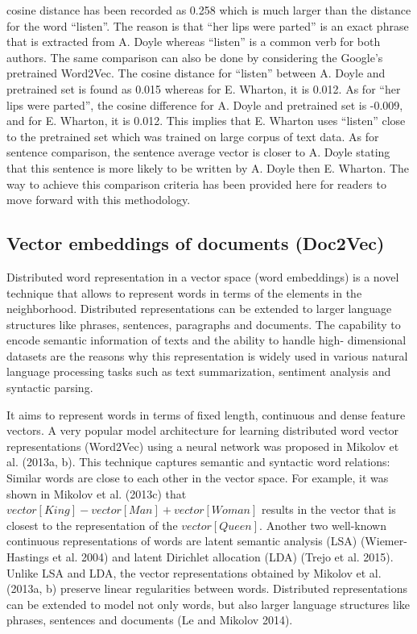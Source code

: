 cosine distance has been recorded as 0.258 which is much larger than the distance for
the word “listen”. The reason is that “her lips were parted” is an exact phrase that
is extracted from A. Doyle whereas “listen” is a common verb for both authors. The
same comparison can also be done by considering the Google’s pretrained Word2Vec.
The cosine distance for “listen” between A. Doyle and pretrained set is found as 0.015
whereas for E. Wharton, it is 0.012. As for “her lips were parted”, the cosine difference
for A. Doyle and pretrained set is -0.009, and for E. Wharton, it is 0.012. This implies
that E. Wharton uses “listen” close to the pretrained set which was trained on large
corpus of text data. As for sentence comparison, the sentence average vector is closer
to A. Doyle stating that this sentence is more likely to be written by A. Doyle then
E. Wharton. The way to achieve this comparison criteria has been provided here for
readers to move forward with this methodology.

\subsection{Vector embeddings of documents (Doc2Vec)}

Distributed word representation in a vector space (word embeddings) is a novel technique that allows to represent words in terms of the elements in the neighborhood.
Distributed representations can be extended to larger language structures like phrases, sentences, paragraphs and documents. The capability to encode semantic information of texts and the ability to handle high- dimensional datasets are the reasons why this representation is widely used in various natural language processing tasks such as text summarization, sentiment analysis and syntactic parsing.

It aims to represent words in terms of fixed length, continuous and dense feature vectors. A very popular model architecture for learning distributed word vector representations (Word2Vec) using a neural network was proposed in Mikolov et al. (2013a, b). This technique captures semantic and syntactic word relations: Similar words are close to each other in the vector space. For example, it was shown in Mikolov et al. (2013c) that $ vector [King] - vector [Man] + vector [Woman]$ results in the vector that is closest to the representation of the $ vector [Queen] $. 
Another two well-known continuous representations of words are latent semantic analysis (LSA) (Wiemer-Hastings et al. 2004) and latent Dirichlet allocation (LDA) (Trejo et al. 2015).
Unlike LSA and LDA, the vector representations obtained by Mikolov et al. (2013a, b) preserve linear regularities between words.
Distributed representations can be extended to model not only words, but also larger language structures like phrases, sentences and documents (Le and Mikolov 2014).